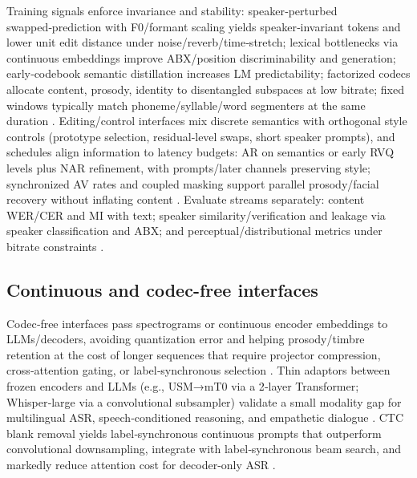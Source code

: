 \documentclass{article}
\begin{document}
Training signals enforce invariance and stability: speaker‑perturbed swapped‑prediction with F0/formant scaling yields speaker‑invariant tokens and lower unit edit distance under noise/reverb/time‑stretch; lexical bottlenecks via continuous embeddings improve ABX/position discriminability and generation; early‑codebook semantic distillation increases LM predictability; factorized codecs allocate content, prosody, identity to disentangled subspaces at low bitrate; fixed windows typically match phoneme/syllable/word segmenters at the same duration \cite{chang2024dcspinspeakerinvariantspeechtokenizerspo,algayres2023generativespokenlanguagemodelbasedcontin,guo2025recentadvancesdiscretespeechtokensreview,kando2025exploringeffectsegmentationvocabularysiz}. Editing/control interfaces mix discrete semantics with orthogonal style controls (prototype selection, residual‑level swaps, short speaker prompts), and schedules align information to latency budgets: AR on semantics or early RVQ levels plus NAR refinement, with prompts/later channels preserving style; synchronized AV rates and coupled masking support parallel prosody/facial recovery without inflating content \cite{chen2025emovaempoweringlanguagemodelsseehearspea,zhang2024speechtokenizerunifiedspeechtokenizerlar,peng2024mslms2stmultitaskspeechlanguagemodeltext,wang2025bossbeyondsemanticspeech,yang2025diffsoundstreamefficientspeechtokenizati,sadok2025vectorquantizedmaskedautoencoderaudiovis}. Evaluate streams separately: content WER/CER and MI with text; speaker similarity/verification and leakage via speaker classification and ABX; and perceptual/distributional metrics under bitrate constraints \cite{zhang2024speechtokenizerunifiedspeechtokenizerlar,guo2025recentadvancesdiscretespeechtokensreview}.

\subsection{Continuous and codec-free interfaces} \label{subsec:Continuous and codec-free interfaces}
Codec‑free interfaces pass spectrograms or continuous encoder embeddings to LLMs/decoders, avoiding quantization error and helping prosody/timbre retention at the cost of longer sequences that require projector compression, cross‑attention gating, or label‑synchronous selection \cite{guo2025recentadvancesdiscretespeechtokensreview}. Thin adaptors between frozen encoders and LLMs (e.g., USM→mT0 via a 2‑layer Transformer; Whisper‑large via a convolutional subsampler) validate a small modality gap for multilingual ASR, speech‑conditioned reasoning, and empathetic dialogue \cite{wang2023slmbridgethingapbetweenspeechtextfoundat,wang2024blspemotowardsempatheticlargespeechlangu,nguyen2025qwenvsgemmaintegrationwhispercomparative}. CTC blank removal yields label‑synchronous continuous prompts that outperform convolutional downsampling, integrate with label‑synchronous beam search, and markedly reduce attention cost for decoder‑only ASR \cite{tsunoo2024decoderonlyarchitecturespeechrecognition}.
\end{document}
